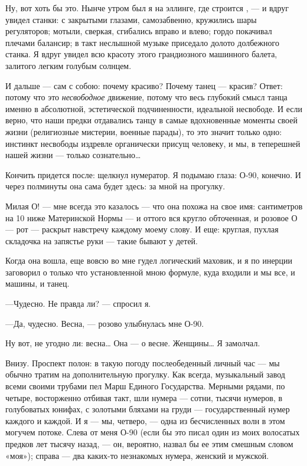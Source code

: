 \documentclass[11pt,openany]{book}
\begin{document}
Ну, вот хоть бы это. Нынче утром был я на эллинге, где строится , --- и вдруг увидел станки: с закрытыми глазами, самозабвенно, кружились шары регуляторов; мотыли, сверкая, сгибались вправо и влево; гордо покачивал плечами балансир; в такт неслышной музыке приседало долото долбежного станка. Я вдруг увидел всю красоту этого грандиозного машинного балета, залитого легким голубым солнцем.

И дальше --- сам с собою: почему красиво? Почему танец --- красив? Ответ: потому что это \emph{несвободное} движение, потому что весь глубокий смысл танца именно в абсолютной, эстетической подчиненности, идеальной несвободе. И если верно, что наши предки отдавались танцу в самые вдохновенные моменты своей жизни (религиозные мистерии, военные парады), то это значит только одно: инстинкт несвободы издревле органически присущ человеку, и мы, в теперешней нашей жизни --- только сознательно\ldots{}

Кончить придется после: щелкнул нумератор. Я подымаю глаза: О-90, конечно. И через полминуты она сама будет здесь: за мной на прогулку.

Милая О! --- мне всегда это казалось --- что она похожа на свое имя: сантиметров на 10 ниже Материнской Нормы --- и оттого вся кругло обточенная, и розовое О --- рот --- раскрыт навстречу каждому моему слову. И еще: круглая, пухлая складочка на запястье руки --- такие бывают у детей.

Когда она вошла, еще вовсю во мне гудел логический маховик, и я по инерции заговорил о только что установленной мною формуле, куда входили и мы все, и машины, и танец.

---Чудесно. Не правда ли? --- спросил я.

---Да, чудесно. Весна, --- розово улыбнулась мне О-90.

Ну вот, не угодно ли: весна\ldots{} Она --- о весне. Женщины\ldots{} Я замолчал.

Внизу. Проспект полон: в такую погоду послеобеденный личный час --- мы обычно тратим на дополнительную прогулку. Как всегда, музыкальный завод всеми своими трубами пел Марш Единого Государства. Мерными рядами, по четыре, восторженно отбивая такт, шли нумера --- сотни, тысячи нумеров, в голубоватых юнифах, с золотыми бляхами на груди --- государственный нумер каждого и каждой. И я --- мы, четверо, --- одна из бесчисленных волн в этом могучем потоке. Слева от меня О-90 (если бы это писал один из моих волосатых предков лет тысячу назад, --- он, вероятно, назвал бы ее этим смешным словом «моя»); справа --- два каких-то незнакомых нумера, женский и мужской.
\end{document}
